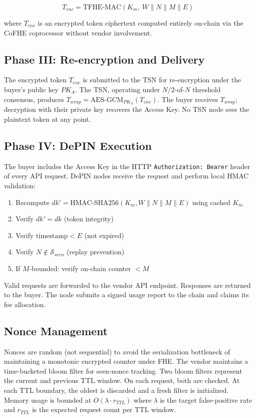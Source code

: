 \documentclass[conference]{IEEEtran}
\begin{document}
\begin{equation}
T_{enc} = \mathrm{TFHE\text{-}MAC}(K_m,\ W \| N \| M \| E)
\label{eq:token}
\end{equation}

where $T_{enc}$ is an encrypted token ciphertext computed entirely on-chain via the
CoFHE coprocessor without vendor involvement.

\subsection{Phase III: Re-encryption and Delivery}
The encrypted token $T_{enc}$ is submitted to the TSN for re-encryption under the
buyer's public key $PK_A$. The TSN, operating under $N/2$-of-$N$ threshold consensus,
produces $T_{wrap} = \mathrm{AES\text{-}GCM}_{PK_A}(T_{enc})$. The buyer receives
$T_{wrap}$; decryption with their private key recovers the Access Key. No TSN node
sees the plaintext token at any point.

\subsection{Phase IV: DePIN Execution}
The buyer includes the Access Key in the HTTP \texttt{Authorization: Bearer} header
of every API request. DePIN nodes receive the request and perform local HMAC validation:

\begin{enumerate}
\item Recompute $dk' = \mathrm{HMAC\text{-}SHA256}(K_m, W \| N \| M \| E)$ using
      cached $K_m$
\item Verify $dk' = dk$ (token integrity)
\item Verify $\mathrm{timestamp} < E$ (not expired)
\item Verify $N \notin \mathcal{S}_{seen}$ (replay prevention)
\item If $M$-bounded: verify on-chain counter $< M$
\end{enumerate}

Valid requests are forwarded to the vendor API endpoint. Responses are returned to the
buyer. The node submits a signed usage report to the chain and claims its fee allocation.

\subsection{Nonce Management}
Nonces are random (not sequential) to avoid the serialization bottleneck of maintaining
a monotonic encrypted counter under FHE. The vendor maintains a time-bucketed bloom
filter for seen-nonce tracking. Two bloom filters represent the current and previous TTL
window. On each request, both are checked. At each TTL boundary, the oldest is discarded
and a fresh filter is initialized. Memory usage is bounded at $O(\lambda \cdot r_{TTL})$
where $\lambda$ is the target false-positive rate and $r_{TTL}$ is the expected request
count per TTL window.
\end{document}
